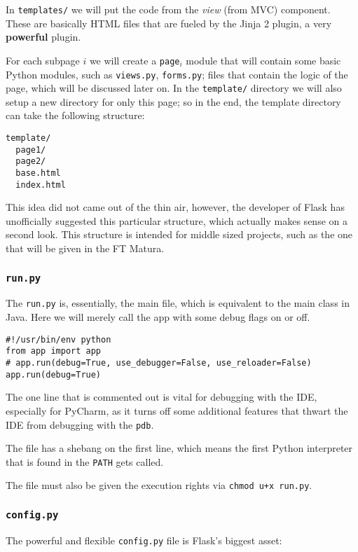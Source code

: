 \documentclass[../main/main.tex]{subfiles}
\begin{document}
In \lstinline|templates/| we will put the code from the \textit{view}
(from MVC) component. These are basically HTML files that are fueled
by the Jinja 2 plugin, a very \textbf{powerful} plugin. 

For each subpage $i$ we will create a \lstinline|page|$_i$ module that
will contain some basic Python modules, such as \lstinline|views.py|,
\lstinline|forms.py|; files that contain the logic of the page, which
will be discussed later on. In the \lstinline|template/| directory we
will also setup a new directory for only this page; so in the end, the
template directory can take the following structure: 

\begin{lstlisting}
template/
  page1/
  page2/
  base.html
  index.html
\end{lstlisting}

This idea did not came out of the thin air, however, the developer of
Flask has unofficially suggested \cite{mitsuhiko:flask} this particular structure, which
actually makes sense on a second look. This structure is intended for
middle sized projects, such as the one that will be given in the FT
Matura. 

\subsubsection{\lstinline|run.py|}

The \lstinline|run.py| is, essentially, the main file, which is
equivalent to the main class in Java. Here we will merely call the app
with some debug flags on or off. 

\begin{lstlisting}[caption=run.py, label=lst:run.py]
#!/usr/bin/env python
from app import app
# app.run(debug=True, use_debugger=False, use_reloader=False)
app.run(debug=True)
\end{lstlisting}

The one line that is commented out is vital for debugging with the
IDE, especially for PyCharm, as it turns off some additional features
that thwart the IDE from debugging with the \lstinline|pdb|. 

The file has a shebang on the first line, which means the first Python
interpreter that is found in the \lstinline|PATH| gets called. 

The file must also be given the execution rights via \lstinline|chmod u+x run.py|. 

\subsubsection{\lstinline|config.py|}
\label{sec:config.py}
The powerful and flexible \lstinline|config.py| file is Flask's
biggest asset: 
\end{document}
